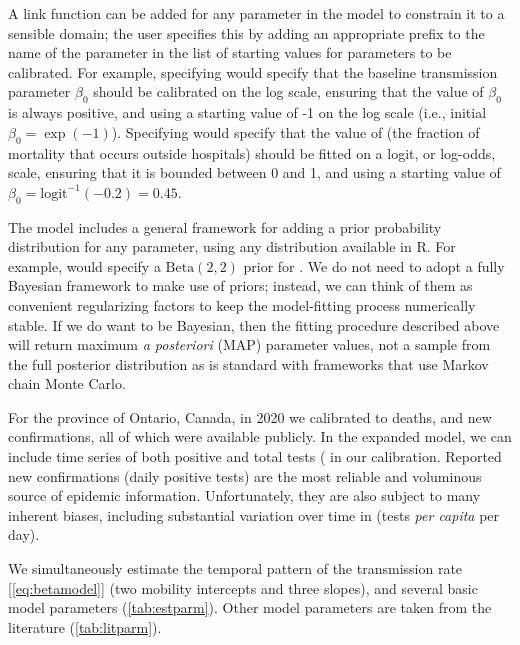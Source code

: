 \documentclass[12pt]{article}\usepackage[]{graphicx}\usepackage[]{color}
\begin{document}
A link function can be added for any parameter in the model to constrain it to a sensible domain; the user specifies this by adding an appropriate prefix to the name of the parameter in the list of starting values for parameters to be calibrated. 
For example, specifying  would specify that the baseline transmission parameter $\beta_0$ should be calibrated on the log scale, ensuring that the value of $\beta_0$ is always positive, and using a starting value of -1 on the log scale (i.e., initial $\beta_0 = \exp(-1)$). 
Specifying  would specify that the value of  (the fraction of mortality that occurs outside hospitals) should be fitted on a logit, or log-odds, scale, ensuring that it is bounded between 0 and 1, and using a starting value of $\beta_0 = \textrm{logit}^{-1}(-{0.2}) = 0.45$.

The model includes a general framework for adding a prior probability distribution for any parameter, using any distribution available in R. 
For example,  would specify a $\textrm{Beta}(2,2)$ prior for .
We do not need to adopt a fully Bayesian framework to make use of priors; instead, we can think of them as convenient regularizing factors to keep the model-fitting process numerically stable. If we do want to be Bayesian, then the fitting procedure described above will return maximum \emph{a posteriori} (MAP) parameter values, not a sample from the full posterior distribution as is standard with frameworks that use Markov chain Monte Carlo.

For the province of Ontario, Canada, in 2020
we calibrated to deaths, and new confirmations, all of which were available publicly. 
In the expanded model, we can include time series of both positive and total tests ( in our calibration. 
Reported new confirmations (daily positive tests) are the most reliable and voluminous source of epidemic information.
Unfortunately, they are also subject to many inherent biases, including substantial variation over time in  (\ie tests \emph{per capita} per day).

We simultaneously estimate the temporal pattern of the transmission rate [\cref{eq:betamodel}] (two mobility intercepts and three slopes), and several basic model parameters (\cref{tab:estparm}).
Other model parameters are taken from the literature (\cref{tab:litparm}).
\end{document}
